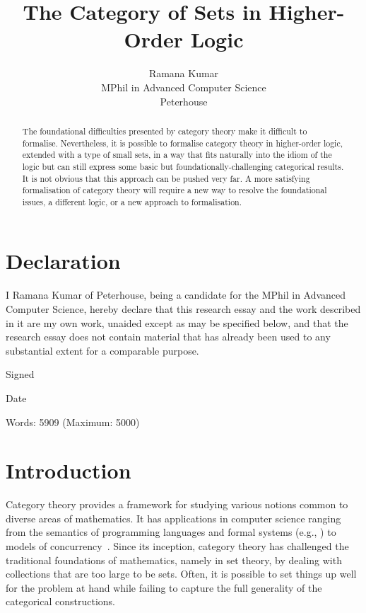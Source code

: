 \documentclass[twoside,titlepage,11pt]{article}
\title{The Category of Sets in Higher-Order Logic}
\author{Ramana Kumar\\MPhil in Advanced Computer Science\\Peterhouse}
\begin{document}
\maketitle
\section*{Declaration}%
\thispagestyle{empty}
I Ramana Kumar of Peterhouse, being a candidate for the MPhil in Advanced Computer Science, hereby declare that this research essay and the work described in it are my own work, unaided except as may be specified below, and that the research essay does not contain material that has already been used to any substantial extent for a comparable purpose.

\vspace{1em}
\noindent Signed

\vspace{1em}
\noindent Date

\vspace{2em}
\noindent Words: 5909 (Maximum: 5000)
\begin{abstract}%
The foundational difficulties presented by category theory make it difficult to formalise.
Nevertheless, it is possible to formalise category theory in higher-order logic, extended with a type of small sets, in a way that fits naturally into the idiom of the logic but can still express some basic but foundationally-challenging categorical results.
It is not obvious that this approach can be pushed very far.
A more satisfying formalisation of category theory will require a new way to resolve the foundational issues, a different logic, or a new approach to formalisation.
\end{abstract}%
\section{Introduction}%
Category theory provides a framework for studying various notions common to diverse areas of mathematics.
It has applications in computer science ranging from the semantics of programming languages and formal systems (e.g., \cite{CroleCT,JacobsCLTT}) to models of concurrency~\cite{DBLP:conf/csl/CattaniW96}.
Since its inception, category theory has challenged the traditional foundations of mathematics, namely in set theory, by dealing with collections that are too large to be sets. 
Often, it is possible to set things up well for the problem at hand while failing to capture the full generality of the categorical constructions.
\end{document}
